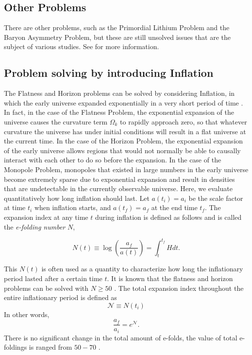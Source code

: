 \documentclass[12pt]{article}
\newcommand{\tcb}[2]{\begin{tcolorbox}[title={\textcolor{white}{#1}}, opacitybacktitle = 0, colframe=white!40!black]#2
\end{tcolorbox}}
\numberwithin{equation}{section}
\begin{document}
\subsection*{Other Problems}
There are other problems, such as the Primordial Lithium Problem and the Baryon Asymmetry Problem, but these are still unsolved issues that are the subject of various studies. See \cite{Fields:2011zzb}\cite{Bernreuther:2002uj} for more information.

\subsection{Problem solving by introducing Inflation}
The Flatness and Horizon problems can be solved by considering Inflation, in which the early universe expanded exponentially in a very short period of time \cite{Guth:1980zm}. In fact, in the case of the Flatness Problem, the exponential expansion of the universe causes the curvature term $\Omega_k$ to rapidly approach zero, so that whatever curvature the universe has under initial conditions will result in a flat universe at the current time. In the case of the Horizon Problem, the exponential expansion of the early universe allows regions that would not normally be able to causally interact with each other to do so before the expansion. In the case of the Monopole Problem, monopoles that existed in large numbers in the early universe become extremely sparse due to exponential expansion and result in densities that are undetectable in the currently observable universe. Here, we evaluate quantitatively how long inflation should last. Let $a(t_i) = a_i$ be the scale factor at time $t_i$ when inflation starts, and $a(t_f) = a_f$ at the end time $t_f$. The expansion index at any time $t$ during inflation is defined as follows and is called the \textit{e-folding number} $N$,
\tcb{e-folding number}{
    \begin{equation}\label{e-folding_def}
        N(t) \equiv \log\left( \frac{a_f}{a(t)} \right) = \int_{t}^{t_f} H dt.
    \end{equation}
}
\noindent This $N(t)$ is often used as a quantity to characterize how long the inflationary period lasted after a certain time $t$. It is known that the flatness and horizon problems can be solved with $N \geq 50$ \cite{Riotto:2002yw}. The total expansion index throughout the entire inflationary period is defined as 
\begin{equation}
    \mathcal{N} \equiv N(t_i)
\end{equation}
In other words, 
\begin{equation}
    \frac{a_f}{a_i} = e^{\mathcal{N}}.
\end{equation}
There is no significant change in the total amount of e-folds, the value of total e-foldings is ranged from $50-70$ \cite{Lyth:1998xn}.
\end{document}
